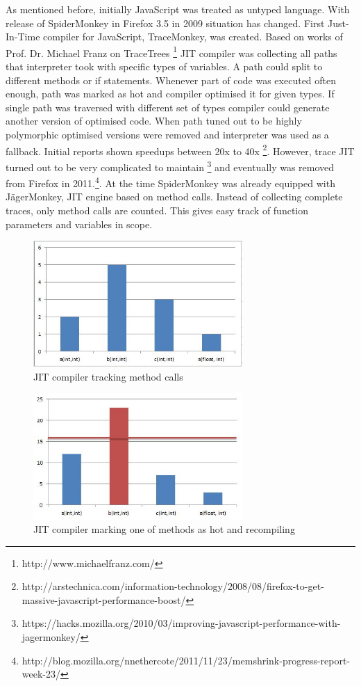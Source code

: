 As mentioned before, initially JavaScript was treated as untyped language. With release of SpiderMonkey in Firefox 3.5 in 2009 situation has changed. First Just-In-Time compiler for JavaScript, TraceMonkey, was created. Based on works of Prof. Dr. Michael Franz on TraceTrees \footnote{http://www.michaelfranz.com/} JIT compiler was collecting all paths that interpreter took with specific types of variables. A path could split to different methods or if statements. Whenever part of code was executed often enough, path was marked as hot and compiler optimised it for given types. If single path was traversed with different set of types compiler could generate another version of optimised code. When path tuned out to be highly polymorphic optimised versions were removed and interpreter was used as a fallback.
Initial reports shown speedups between 20x to 40x \footnote{http://arstechnica.com/information-technology/2008/08/firefox-to-get-massive-javascript-performance-boost/}.
However, trace JIT turned out to be very complicated to maintain \footnote{https://hacks.mozilla.org/2010/03/improving-javascript-performance-with-jagermonkey/} and eventually was removed from Firefox in 2011.\footnote{http://blog.mozilla.org/nnethercote/2011/11/23/memshrink-progress-report-week-23/}. At the time SpiderMonkey was already equipped with JägerMonkey, JIT engine based on method calls. Instead of collecting complete traces, only method calls are counted. This gives easy track of function parameters and variables in scope.

\begin{figure}[h!]
  \caption{JIT compiler tracking method calls}
  \label{img:jit-1}
  \centering
	\includegraphics[width=8cm]{jit-1}
\end{figure}


\begin{figure}[h!]
  \caption{JIT compiler marking one of methods as hot and recompiling}
  \label{img:jit-2}
  \centering
	\includegraphics[width=8cm]{jit-2}
\end{figure}

